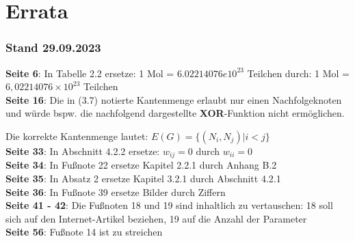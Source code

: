 \chapter*{Errata}

\subsection*{Stand 29.09.2023}

\textbf{Seite 6}: In Tabelle 2.2 ersetze: 1 Mol = $6.02214076e10^{23}$ Teilchen durch: 1 Mol = $6,02214076\times10^{23}$ Teilchen\\

\noindent
\textbf{Seite 16}:
Die in (3.7) notierte Kantenmenge erlaubt nur einen Nachfolgeknoten und würde {bspw.} die nachfolgend dargestellte \textbf{XOR}-Funktion nicht ermöglichen.

Die korrekte Kantenmenge lautet: $E(G) = \{(N_i, N_j) | i < j\}$\\

\noindent
\textbf{Seite 33}:
In Abschnitt 4.2.2 ersetze: $w_{ij} = 0$ durch $w_{ii} = 0$\\

\noindent
\textbf{Seite 34}:
In Fußnote 22 ersetze Kapitel 2.2.1 durch Anhang B.2\\

\noindent
\textbf{Seite 35}:
In Absatz 2 ersetze Kapitel 3.2.1 durch Abschnitt 4.2.1\\

\noindent
\textbf{Seite 36}:
In Fußnote 39 ersetze Bilder durch Ziffern\\

\noindent
\textbf{Seite 41 - 42}:
Die Fußnoten 18 und 19 sind inhaltlich zu vertauschen: 18 soll sich auf den Internet-Artikel beziehen, 19 auf die Anzahl der Parameter\\

\noindent
\textbf{Seite 56}:
Fußnote 14 ist zu streichen\\
